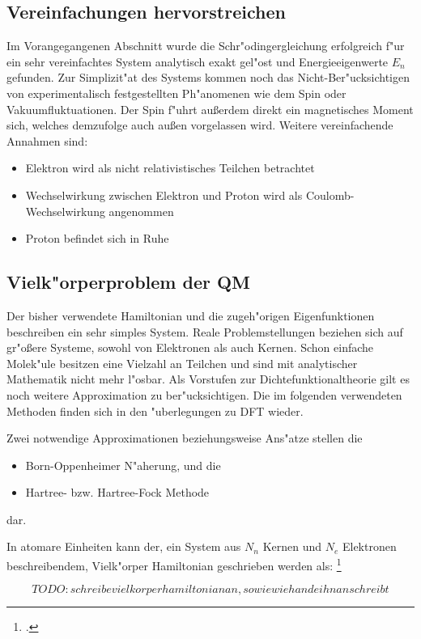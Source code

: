 \subsection{Vereinfachungen hervorstreichen}

Im Vorangegangenen Abschnitt wurde die Schr"odingergleichung erfolgreich f"ur ein sehr vereinfachtes System analytisch exakt gel"ost und Energieeigenwerte $E_n$gefunden. Zur Simplizit"at des Systems kommen noch das Nicht-Ber"ucksichtigen von experimentalisch festgestellten Ph"anomenen wie dem Spin oder Vakuumfluktuationen. Der Spin f"uhrt außerdem direkt ein magnetisches Moment sich, welches demzufolge auch außen vorgelassen wird. Weitere vereinfachende Annahmen sind: 
\begin{itemize}
\item Elektron wird als nicht relativistisches Teilchen betrachtet
\item Wechselwirkung zwischen Elektron und Proton wird als Coulomb-Wechselwirkung angenommen
\item Proton befindet sich in Ruhe 
\end{itemize}


\subsection{Vielk"orperproblem der QM}
Der bisher verwendete Hamiltonian und die zugeh"origen Eigenfunktionen beschreiben ein sehr simples System. Reale Problemstellungen beziehen sich auf gr"oßere Systeme, sowohl von Elektronen als auch Kernen. Schon einfache Molek"ule besitzen eine Vielzahl an Teilchen und sind mit analytischer Mathematik nicht mehr l"osbar. Als Vorstufen zur Dichtefunktionaltheorie gilt es noch weitere Approximation zu ber"ucksichtigen. Die im folgenden verwendeten Methoden finden sich in den "uberlegungen zu DFT wieder. 

Zwei notwendige Approximationen  beziehungsweise Ans"atze stellen die 

\begin{itemize}
\item Born-Oppenheimer N"aherung, und die 
\item Hartree- bzw. Hartree-Fock Methode
\end{itemize}
dar. 

In atomare Einheiten kann der, ein System aus $N_n$  Kernen und $N_e$  Elektronen beschreibendem, Vielk"orper Hamiltonian geschrieben werden als: \footcite[Lecture 4][2]{hande}


$$TODO: schreibe vielkorper hamiltonian an, sowie wie hande ihn anschreibt$$

